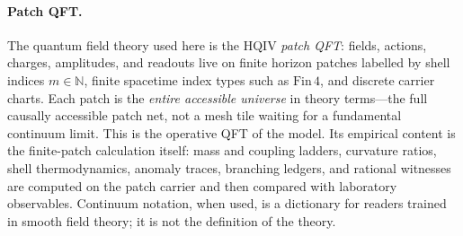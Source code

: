 
\providecommand{\leanCertAnomaly}{}
\providecommand{\leanCertTopology}{}
\providecommand{\leanCertStrongColor}{}
\providecommand{\leanPatchHolonomyWitness}{(\leanfile{Hqiv/Physics/SO8PlaquetteHolonomy.lean},
witness \leanid{so8PlaquetteHolonomyDischarged_holds})}
\providecommand{\leanPatchWilsonKinetic}{(\leanfile{Hqiv/Physics/ActionHolonomyGlue.lean},
witness \leanid{wilsonKineticPlaquetteEquivalence_discharged})}
\providecommand{\leanPatchHaarMeasure}{(\leanfile{Hqiv/Physics/NonAbelianHolonomyMeasureScaffold.lean})}
\providecommand{\leanPatchDiscretePoincare}{(\leanfile{Hqiv/Physics/DiscreteActionStrongPoincareBridge.lean},
\leanfile{Hqiv/Physics/DiscreteActionPoincareScaffold.lean})}
\providecommand{\leanPatchSpatialRotation}{(\leanfile{Hqiv/Geometry/SpatialRotationLorentzClosure.lean},
witness \leanid{spatial_rotation_lorentz_closure_discharged})}
\providecommand{\leanfile}[1]{\nolinkurl{#1}}
\providecommand{\leanid}[1]{\nolinkurl{#1}}

\paragraph{Patch QFT.}
The quantum field theory used here is the HQIV \emph{patch QFT}: fields, actions,
charges, amplitudes, and readouts live on finite horizon patches labelled by shell
indices $m\in\mathbb{N}$, finite spacetime index types such as $\mathrm{Fin}\,4$,
and discrete carrier charts.  Each patch is the \emph{entire accessible universe} in
theory terms---the full causally accessible patch net, not a mesh tile waiting for a
fundamental continuum limit.  This is the operative QFT of the model.  Its empirical content is
the finite-patch calculation itself: mass and coupling ladders, curvature ratios,
shell thermodynamics, anomaly traces, branching ledgers, and rational witnesses
are computed on the patch carrier and then compared with laboratory observables.
Continuum notation, when used, is a dictionary for readers trained in smooth
field theory; it is not the definition of the theory.

